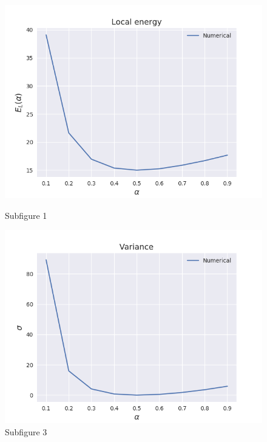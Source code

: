 \documentclass[norsk,a4paper,12pt]{article}
\begin{document}
\begin{figure}[h] %
	\begin{minipage}[t]{.45\linewidth}
		\includegraphics[width=\linewidth]{images/energy.png}
		\caption{Subfigure 1}
	\end{minipage}\hfill
	\begin{minipage}[b]{.45\linewidth}
		\includegraphics[width=\linewidth]{images/variance.png}
	\end{minipage}
	\caption{Subfigure 3}
\end{figure}
\end{document}
